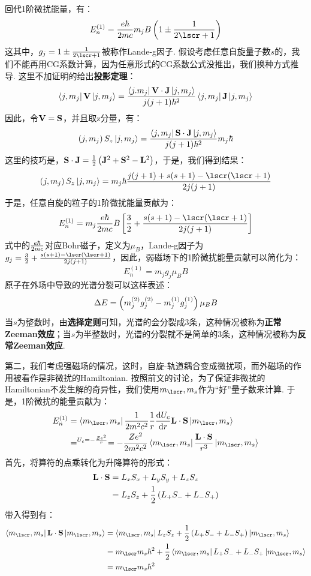 回代1阶微扰能量，有：
\[
E_{n}^{(1)} = \frac{e\hh}{2mc}m_{j}B\br{1\pm\frac{1}{2\lscr+1}}
\]
这其中，\(g_{j} = 1\pm\frac{1}{2\lscr+1}\)被称作Lande-g因子. 假设考虑任意自旋量子数\(s\)的，我们不能再用CG系数计算，因为任意形式的CG系数公式没推出，我们换种方式推导. 这里不加证明的给出\textbf{投影定理}：
\[
\bra{j,m_{j}}\mathbf{V}\ket{j,m_{j}} = \frac{\bra{j.m_{j}}\mathbf{V}\cdot\mathbf{J}\ket{j,m_{j}}}{j(j+1)\hbar^{2}}\bra{j,m_{j}}\mathbf{J}\ket{j,m_{j}}
\]
因此，令\(\mathbf{V} = \mathbf{S}\)，并且取z分量，有：
\[
\left({j,m_{j}}\right)S_{z}\ket{j,m_{j}} = \frac{\bra{j,m_{j}}\mathbf{S}\cdot\mathbf{J}\ket{j,m_{j}}}{j(j+1)\hbar^{2}}m_{j}\hbar
\]
这里的技巧是，\(\mathbf{S}\cdot\mathbf{J} = \frac{1}{2}\left({\mathbf{J}^{2}+\mathbf{S}^{2}-\mathbf{L}^{2}}\right)\)，于是，我们得到结果：
\[
\br{j,m_{j}}S_{z}\ket{j,m_{j}} = m_{j}\hh\frac{j(j+1)+s(s+1)-\lscr(\lscr+1)}{2j(j+1)}
\]
于是，任意自旋的粒子的1阶微扰能量贡献为：
\[
E_{n}^{(1)} = m_{j}\frac{e\hh}{2mc}B\mbr{\frac{3}{2}+\frac{s(s+1)-\lscr(\lscr+1)}{2j(j+1)}}
\]
式中的\(\frac{e\hbar}{2mc}\)对应Bohr磁子，定义为\(\mu_{B}\)，Lande-g因子为\(g_{j}=\frac{3}{2}+\frac{s(s+1)-\lscr(\lscr+1)}{2j(j+1)}\)，因此，弱磁场下的1阶微扰能量贡献可以简化为：
\[
E_{n}^{(1)} = m_{j}g_{j}\mu_{B}B
\]
原子在外场中导致的光谱分裂可以这样表述：
\[
\Delta{E} = \left({m_{j}^{(2)}g_{j}^{(2)} - m_{j}^{(1)}g_{j}^{(1)}}\right)\mu_{B}B
\]
当\(s\)为整数时，由\textbf{选择定则}可知，光谱的会分裂成3条，这种情况被称为\textbf{正常Zeeman效应}；当\(s\)为半整数时，光谱的分裂就不是简单的3条，这种情况被称为\textbf{反常Zeeman效应}. \par\noindent
第二，我们考虑强磁场的情况，这时，自旋-轨道耦合变成微扰项，而外磁场的作用被看作是非微扰的Hamiltonian. 按照前文的讨论，为了保证非微扰的Hamiltonian不发生解的奇异性，我们使用\(m_{\lscr},m_{s}\)作为“好”量子数来计算. 于是，1阶微扰的能量贡献为：
\begin{align*}
E_{n}^{(1)}
& = \bra{m_{\lscr},m_{s}}\frac{1}{2m^{2}c^{2}}\frac{1}{r}\de{U_{c}}{r}\vL\cdot\vS \ket{m_{\lscr},m_{s}} \\
& =^{U_{c}=-\frac{Ze^{2}}{r}}= -\frac{Ze^{2}}{2m^{2}c^{2}}\bra{m_{\lscr},m_{s}}\frac{\vL\cdot\vS}{r^{3}}\ket{m_{\lscr},m_{s}}
\end{align*}
首先，将算符的点乘转化为升降算符的形式：
\begin{align*}
\mathbf{L}\cdot\mathbf{S}
& = L_{x}S_{x} + L_{y}S_{y} + L_{z}S_{z} \\
& = L_{z}S_{z} + \frac{1}{2}\left({L_{+}S_{-} + L_{-}S_{+}}\right)
\end{align*}
带入得到有：
\begin{align*}
\bra{m_{\lscr},m_{s}}\vL\cdot\vS\ket{m_{\lscr},m_{s}} 
& = \bra{m_{\lscr},m_{s}}L_{z}S_{z} + \frac{1}{2}\br{L_{+}S_{-} + L_{-}S_{+}}\ket{m_{\lscr},m_{s}} \\
& = m_{\lscr}m_{s}\hh^{2} + \frac{1}{2}\bra{m_{\lscr},m_{s}}L_{+}S_{-} + L_{-}S_{+}\ket{m_{\lscr},m_{s}} \\
& = m_{\lscr}m_{s}\hh^{2}
\end{align*}
